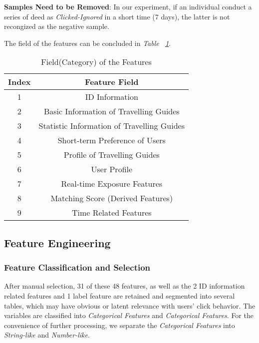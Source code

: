 \documentclass{article}
\begin{document}
    \textbf{Samples Need to be Removed}: In our experiment, if an individual conduct a series of deed as \emph{Clicked-Ignored} in a short time (7 days), the latter is not recongized as the negative sample.

    The field of the features can be concluded in \emph{Table ~\ref{ta:field}}.

    \begin{table}[!h]
		\centering
		\small{
		    \caption{Field(Category) of the Features}
			\begin{tabular}{cc}
				\toprule
				\textbf{Index}  & \textbf{Feature Field}\\ 
				\midrule
				1          & ID Information \\ 
				2          & Basic Information of Travelling Guides \\ 
				3          & Statistic Information of Travelling Guides \\
				4          & Short-term Preference of Users \\
				5          & Profile of Travelling Guides \\
				6          & User Profile \\
				7          & Real-time Exposure Features \\
				8          & Matching Score (Derived Features) \\
				9          & Time Related Features\\
			\bottomrule 
			\end{tabular}			
			\label{ta:field}
		}
	\end{table}

	\subsection{Feature Engineering}

    \subsubsection{Feature Classification and Selection}

    After manual selection, 31 of these 48 features, as well as the 2 ID information related features and 1 label feature are retained and segmented into several tables, which may have obvious or latent relevance with users' click behavior. The variables are classified into \emph{Categorical Features} and \emph{Categorical Features}. For the convenience of further processing, we separate the \emph{Categorical Features} into \emph{String-like} and \emph{Number-like}.  
    
\end{document}
